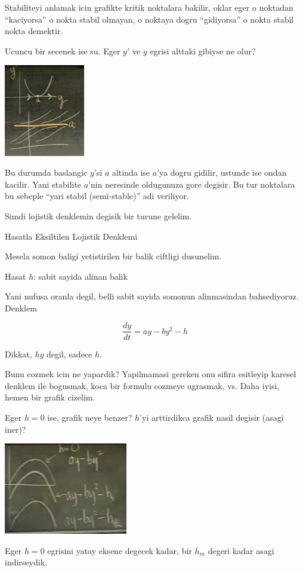 \documentclass[12pt,fleqn]{article}
\begin{document}
Stabiliteyi anlamak icin grafikte kritik noktalara bakilir, oklar eger o
noktadan ``kaciyorsa'' o nokta stabil olmayan, o noktaya dogru
``gidiyorsa'' o nokta stabil nokta demektir.

Ucuncu bir secenek ise su. Eger $y'$ ve $y$ egrisi alttaki gibiyse ne olur?

\includegraphics[height=4cm]{5_9.png}

Bu durumda baslangic $y$'si $a$ altinda ise $a$'ya dogru gidilir, ustunde
ise ondan kacilir. Yani stabilite $a$'nin neresinde oldugunuza gore
degisir. Bu tur noktalara bu sebeple ``yari stabil (semi-stable)'' adi
veriliyor. 

Simdi lojistik denklemin degisik bir turune gelelim. 

Hasatla Eksiltilen Lojistik Denklemi

Mesela somon baligi yetistirilen bir balik ciftligi dusunelim. 

Hasat $h$: sabit sayida alinan balik

Yani nufusa oranla degil, belli sabit sayida somonun alinmasindan
bahsediyoruz. Denklem

\[ \frac{dy}{dt} = ay - by^2 - h \]

Dikkat, $hy$ degil, sadece $h$. 

Bunu cozmek icin ne yapardik? Yapilmamasi gereken onu sifira esitleyip
karesel denklem ile bogusmak, koca bir formulu cozmeye ugrasmak, vs. Daha
iyisi, hemen bir grafik cizelim. 

Eger $h=0$ ise, grafik neye benzer? $h$'yi arttirdikca grafik nasil degisir
(asagi iner)? 

\includegraphics[height=4cm]{5_10.png}

Eger $h=0$ egrisini yatay eksene degecek kadar, bir $h_m$ degeri kadar
asagi indirseydik, 
\end{document}
